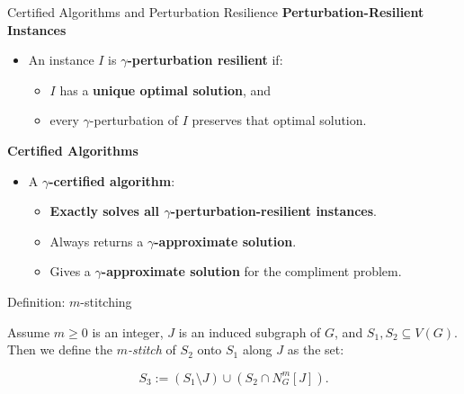 \documentclass{beamer}
\begin{document}
\begin{frame}{Certified Algorithms and Perturbation Resilience}
  \textbf{Perturbation-Resilient Instances}
  \begin{itemize}
      \item An instance $I$ is \textbf{$\gamma$-perturbation resilient} if:
      \begin{itemize}
          \item $I$ has a \textbf{unique optimal solution}, and
          \item every $\gamma$-perturbation of $I$ preserves that optimal solution.
      \end{itemize}
  \end{itemize}

  \vspace{1em}
  \textbf{Certified Algorithms}
  \begin{itemize}
      \item A \textbf{$\gamma$-certified algorithm}:
      \begin{itemize}
          \item \textbf{Exactly solves all $\gamma$-perturbation-resilient instances}.
          \item Always returns a \textbf{$\gamma$-approximate solution}.
          \item Gives a \textbf{$\gamma$-approximate solution} for the compliment problem.
      \end{itemize}
  \end{itemize}
\end{frame}


\begin{frame}{Definition: $m$-stitching}
    \begin{definition}[$m$-stitching]
        \label{m-stitch}
        Assume $m \geq 0$ is an integer, $J$ is an induced subgraph of $G$, and 
        $S_1, S_2 \subseteq V(G)$. Then we define the \textit{$m$-stitch} of $S_2$ onto $S_1$ along 
        $J$ as the set:

        \[
        S_3 := (S_1 \setminus J) \cup (S_2 \cap N^{m}_{G}[J]).
        \]
    \end{definition}
\end{frame}
\end{document}
